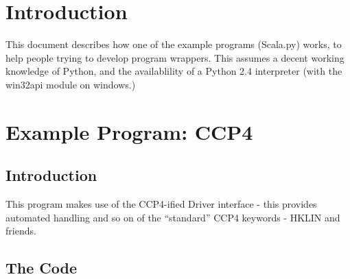 \documentclass[a4paper, 11pt]{article}
\begin{document}
\section{Introduction}

This document describes how one of the example programs (Scala.py) works, 
to help people trying to develop program wrappers. This assumes a decent 
working knowledge of Python, and the availablility of a Python 2.4 
interpreter (with the win32api module on windows.)

\section{Example Program: CCP4}

\subsection{Introduction}

This program makes use of the CCP4-ified Driver interface - this provides 
automated handling and so on of the ``standard'' CCP4 keywords - HKLIN and
friends.

\subsection{The Code}
\end{document}
